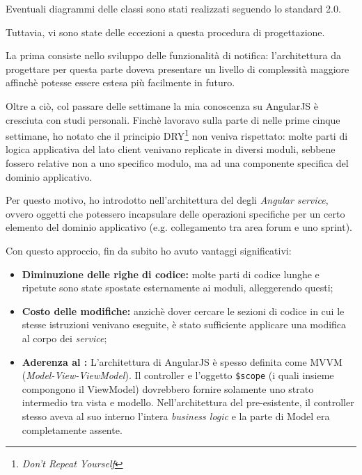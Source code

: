 Eventuali diagrammi delle classi sono stati realizzati seguendo lo standard
 2.0.

Tuttavia, vi sono state delle eccezioni a questa procedura di progettazione.

La prima consiste nello sviluppo delle funzionalità di notifica: l'architettura
da progettare per questa parte doveva presentare un livello di complessità
maggiore affinchè potesse essere estesa più facilmente in futuro.

Oltre a ciò, col passare delle settimane la mia conoscenza su AngularJS è
cresciuta con studi personali. Finchè lavoravo sulla parte di \FREND{} nelle
prime cinque settimane, ho notato che il principio DRY\footnote{\emph{Don't
Repeat Yourself}} non veniva rispettato: molte parti di logica applicativa del
lato client venivano replicate in diversi moduli, sebbene fossero relative non
a uno specifico modulo, ma ad una componente specifica del dominio applicativo.

Per questo motivo, ho introdotto nell'architettura del \FREND{} degli
\emph{Angular service}, ovvero oggetti che potessero incapsulare delle
operazioni specifiche per un certo elemento del dominio applicativo (e.g.
collegamento tra area forum e uno sprint).

Con questo approccio, fin da subito ho avuto vantaggi significativi:

\begin{itemize}
\item \textbf{Diminuzione delle righe di codice:} molte parti di codice lunghe
  e ripetute sono state spostate esternamente ai moduli, alleggerendo questi;
\item \textbf{Costo delle modifiche:} anzichè dover cercare le sezioni di
  codice in cui le stesse istruzioni venivano eseguite, è stato sufficiente
  applicare una modifica al corpo dei \emph{service};
\item \textbf{Aderenza al :} L'architettura di AngularJS è
  spesso definita come MVVM (\emph{Model-View-ViewModel}). Il controller e
  l'oggetto \texttt{\$scope} (i quali insieme compongono il ViewModel)
  dovrebbero fornire solamente uno strato intermedio tra vista e modello.
  Nell'architettura del \FREND{} pre-esistente, il controller stesso aveva al
  suo interno l'intera \emph{business logic} e la parte di Model era
  completamente assente.
\end{itemize}

